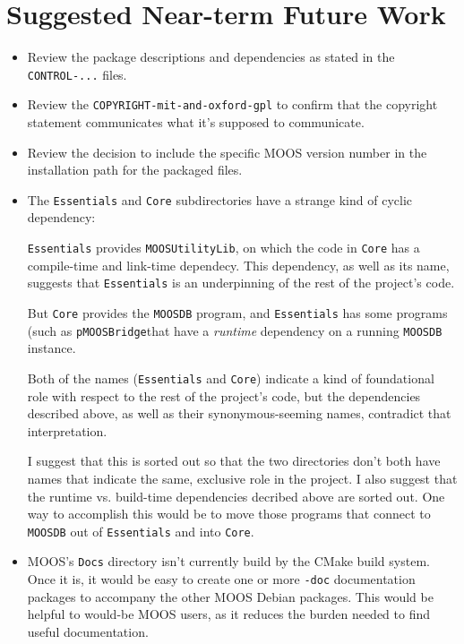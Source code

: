 \documentclass[letterpaper,10pt]{article}
\begin{document}
\section{Suggested Near-term Future Work}
\begin{itemize}
 \item Review the package descriptions and dependencies as stated in the
	\verb|CONTROL-...| files.

 \item Review the \verb|COPYRIGHT-mit-and-oxford-gpl| to confirm that the
	copyright statement communicates what it's supposed to communicate.

 \item Review the decision to include the specific MOOS version number in
	the installation path for the packaged files.

 \item The \verb|Essentials| and \verb|Core| subdirectories have a strange
	kind of cyclic dependency:

	\verb|Essentials| provides \verb|MOOSUtilityLib|, on which the code in \verb|Core| has a
	compile-time and link-time dependecy.  This dependency, as well as its
	name, suggests that \verb|Essentials| is an underpinning of the rest of the
	project's code.
	
	But \verb|Core| provides the \verb|MOOSDB| program, and \verb|Essentials| has some programs
	(such as \verb|pMOOSBridge|that have a \textit{runtime} dependency on a
	running \verb|MOOSDB| instance.

	Both of the names (\verb|Essentials| and \verb|Core|) indicate a kind of foundational
	role with respect to the rest of the project's code, but the dependencies
	described above, as well as their synonymous-seeming names, contradict 
	that interpretation.

	I suggest that this is sorted out so that the two directories don't
	both have names that indicate the same, exclusive role in the project. 
	I also suggest that the runtime vs. build-time dependencies decribed 
	above are sorted out.  One way to accomplish this would be to move
	those programs that connect to \verb|MOOSDB| out of \verb|Essentials| and into 
	\verb|Core|.

 \item MOOS's \verb|Docs| directory isn't currently build by the CMake
	build system.  Once it is, it would be easy to create one or
	more \verb|-doc| documentation packages to accompany the other
	MOOS Debian packages.  This would be helpful to would-be MOOS
	users, as it reduces the burden needed to find useful documentation.
 

\end{itemize}
\end{document}
